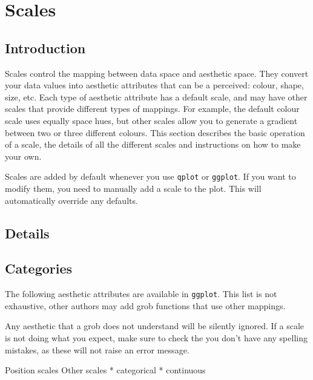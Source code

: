 

\chapter{Scales}

\section{Introduction}\label{sec:introduction}

Scales control the mapping between data space and aesthetic space.  They convert your data values into aesthetic attributes that can be a perceived: colour, shape, size, etc.  Each type of aesthetic attribute has a default scale, and may have other scales that provide different types of mappings.  For example, the default colour scale uses equally space hues, but other scales allow you to generate a gradient between two or three different colours.  This section describes the basic operation of a scale, the details of all the different scales and instructions on how to make your own.

Scales are added by default whenever you use {\tt qplot} or {\tt ggplot}.  If you want to modify them, you need to manually add a scale to the plot.  This will automatically override any defaults.


\section{Details}\label{sec:details}

\section{Categories}\label{sec:categories} 

The following aesthetic attributes are available in {\tt ggplot}.  This list is not exhaustive, other authors may add grob functions that use other mappings.  

Any aesthetic that a grob does not understand will be silently ignored.  If a scale is not doing what you expect, make sure to check the you don't have any spelling mistakes, as these will not raise an error message.

Position scales
Other scales
 * categorical
 * continuous

